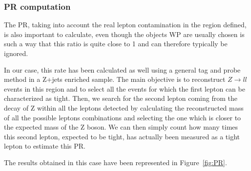 \documentclass[a4paper, 10pt, openright]{report}
\begin{document}
\subsubsection*{\acf{PR} computation}

The \ac{PR}, taking into account the real lepton contamination in the region defined, is also important to calculate, even though the objects \ac{WP} are usually chosen is such a way that this ratio is quite close to 1 and can therefore typically be ignored.

In our case, this rate has been calculated as well using a general tag and probe method in a Z+jets enriched sample. The main objective is to reconstruct $Z \rightarrow ll$ events in this region and to select all the events for which the first lepton can be characterized as tight. Then, we search for the second lepton coming from the decay of Z within all the leptons detected by calculating the reconstructed mass of all the possible leptons combinations and selecting the one which is closer to the expected mass of the Z boson. We can then simply count how many times this second lepton, expected to be tight, has actually been measured as a tight lepton to estimate this \ac{PR}.

The results obtained in this case have been represented in Figure~\ref{fig:PR}.
\end{document}
